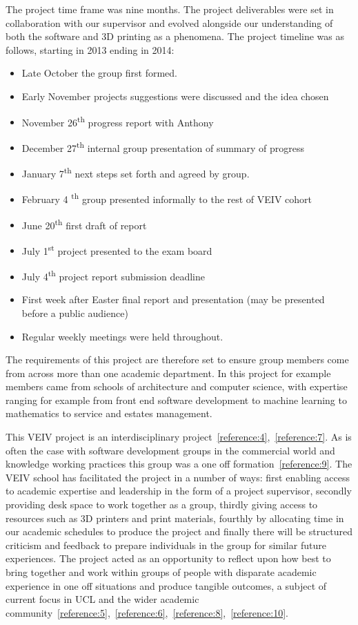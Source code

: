 \documentclass[11pt]{article} %
\begin{document}
The project time frame was nine months. The project deliverables were set in collaboration with our supervisor and evolved alongside our understanding of both the software and 3D printing as a phenomena. The project timeline was as follows, starting in 2013 ending in 2014:

\begin{itemize}
\item Late October the group first formed. 
\item Early November projects suggestions were discussed and the idea chosen 
\item November 26\textsuperscript{th} progress report with Anthony 
\item December 27\textsuperscript{th} internal group presentation of summary of progress 
\item January 7\textsuperscript{th} next steps set forth and agreed by group.
\item February 4 \textsuperscript{th} group presented informally to the rest of VEIV cohort 
\item June 20\textsuperscript{th} first draft of report 
\item July 1\textsuperscript{st} project presented to the exam board
\item July 4\textsuperscript{th} project report submission deadline 
\item First week after Easter final report and presentation (may be presented before a public audience)
\item Regular weekly meetings were held throughout. 
\end{itemize}

The requirements of this project are therefore set to ensure group members come from across more than one academic department. In this project for example members came from schools of architecture and computer science, with expertise ranging for example from front end software development to machine learning to mathematics to service and estates management. 

This VEIV project is an interdisciplinary project~\ref{reference:4},~\ref{reference:7}. As is often the case with software development groups in the commercial world and knowledge working practices this group was a one off formation~\ref{reference:9}. The VEIV school has facilitated the project in a number of ways: first enabling access to academic expertise and leadership in the form of a project supervisor, secondly providing desk space to work together as a group, thirdly giving access to resources such as 3D printers and print materials, fourthly by allocating time in our academic schedules to produce the project and finally there will be structured criticism and feedback to prepare individuals in the group for similar future experiences. The project acted as an opportunity to reflect upon how best to bring together and work within groups of people with disparate academic experience in one off situations and produce tangible outcomes, a subject of current focus in UCL and the wider academic community~\ref{reference:5},~\ref{reference:6},~\ref{reference:8},~\ref{reference:10}. 
\end{document}
